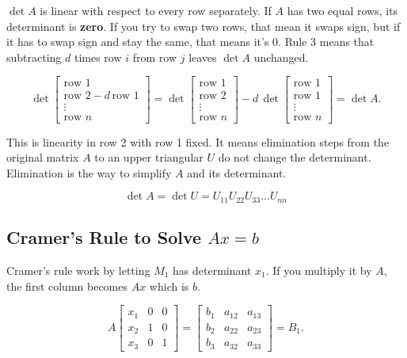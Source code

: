 \(\det A\) is linear with respect to every row separately. If \(A\) has two equal rows, its determinant is \textbf{zero}. If you try to swap two rows, that mean it swaps sign, but if it has to swap sign and stay the same, that means it's 0. Rule 3 means that subtracting \(d\) times row \(i\) from row \(j\) leaves \(\det A\) unchanged. 

\[
\det\!\begin{bmatrix}
\text{row }1\\
\text{row }2 - d\,\text{row }1\\
\vdots\\
\text{row }n
\end{bmatrix}
=
\det\!\begin{bmatrix}
\text{row }1\\
\text{row }2\\
\vdots\\
\text{row }n
\end{bmatrix}
-
d\,\det\!\begin{bmatrix}
\text{row }1\\
\text{row }1\\
\vdots\\
\text{row }n
\end{bmatrix}
= \det A.
\]

This is linearity in row 2 with row 1 fixed.  It means elimination steps from the original matrix \(A\) to an upper triangular \(U\) do not change the determinant. Elimination is the way to simplify \(A\) and its determinant. 

\[
  \det A = \det U = U_{11} U_{22} U_{33}  \ldots U_{nn} 
\]   

\subsection{Cramer's Rule to Solve \(Ax = b\) }

Cramer's rule work by letting \(M_1\) has determinant \(x_1\). If you multiply it by \(A\), the first column becomes \(Ax\) which is \(b\). 

\[
A
\begin{bmatrix}
x_1 & 0 & 0\\
x_2 & 1 & 0\\
x_3 & 0 & 1
\end{bmatrix}
=
\begin{bmatrix}
b_1 & a_{12} & a_{13}\\
b_2 & a_{22} & a_{23}\\
b_3 & a_{32} & a_{33}
\end{bmatrix}
= B_1.
\]

